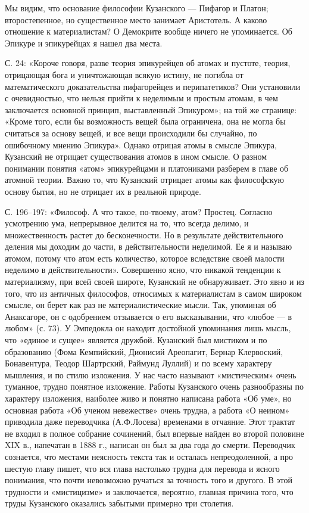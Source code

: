 Мы видим,  что основание  философии Кузанского  --- Пифагор  и Платон;
второстепенное, но  существенное место  занимает Аристотель.  А каково
отношение к  материалистам? О Демокрите вообще  ничего не упоминается.
Об Эпикуре и эпикурейцах я нашел два места.

С. 24: «Короче  говоря, разве теория эпикурейцев об  атомах и пустоте,
теория,  отрицающая  бога и  уничтожающая  всякую  истину, не  погибла
от  математического доказательства  пифагорейцев и  перипатетиков? Они
установили с  очевидностью, что  нельзя прийти  к неделимым  и простым
атомам, в  чем заключается  основной принцип,  выставленный Эпикуром»;
на  той же  странице:  «Кроме  того, если  бы  возможность вещей  была
ограничена, она  не могла  бы считаться  за основу  вещей, и  все вещи
происходили бы случайно, по ошибочному мнению Эпикура». Однако отрицая
атомы  в смысле  Эпикура, Кузанский  не отрицает  существования атомов
в  ином  смысле. О  разном  понимании  понятия «атом»  эпикурейцами  и
платониками  разберем  в  главе  об  атомной  теории.  Важно  то,  что
Кузанский отрицает атомы как философскую  основу бытия, но не отрицает
их в реальной природе.

С.  196--197:  «Философ.  А   что  такое,  по-твоему,  атом?  Простец.
Согласно  усмотрению  ума,  непрерывное  делится  на  то,  что  всегда
делимо,  и множественность  растет до  бесконечности. Но  в результате
действительного  деления  мы  доходим  до  части,  в  действительности
неделимой. Ее  я и  называю атомом, потому  что атом  есть количество,
которое  вследствие   своей  малости  неделимо   в  действительности».
Совершенно ясно, что никакой тенденции  к материализму, при всей своей
широте, Кузанский не обнаруживает. Это явно и из того, что из античных
философов, относимых к материалистам в  самом широком смысле, он берет
как раз не материалистические мысли. Так, упоминая об Анаксагоре, он с
одобрением отзывается о его высказывании,  что «любое --- в любом» (с.
73).  У Эмпедокла  он  находит достойной  упоминания  лишь мысль,  что
«единое  и  сущее»  является  дружбой. Кузанский  был  мистиком  и  по
образованию (Фома  Кемпийский, Дионисий Ареопагит,  Бернар Клервоский,
Бонавентура, Теодор  Шартрский, Раймунд  Луллий) и по  всему характеру
мышления, и  по стилю  изложения. У  нас часто  называют «мистическим»
очень  туманное, трудно  понятное изложение.  Работы Кузанского  очень
разнообразны по характеру изложения,  наиболее живо и понятно написана
работа  «Об уме»,  но  основная работа  «Об  ученом невежестве»  очень
трудна, а  работа «О  неином» приводила даже  переводчика (А.Ф.Лосева)
временами  в  отчаяние.  Этот  трактат не  входил  в  полное  собрание
сочинений, был впервые  найден во второй половине XIX  в., напечатан в
1888 г., написан  он был за два года до  смерти. Переводчик сознается,
что  местами неясность  текста так  и осталась  непреодоленной, а  про
шестую  главу пишет,  что вся  глава настолько  трудна для  перевода и
ясного понимания,  что почти  невозможно ручаться  за точность  того и
другого.  В этой  трудности  и «мистицизме»  и заключается,  вероятно,
главная причина того, что труды Кузанского оказались забытыми примерно
три столетия.

